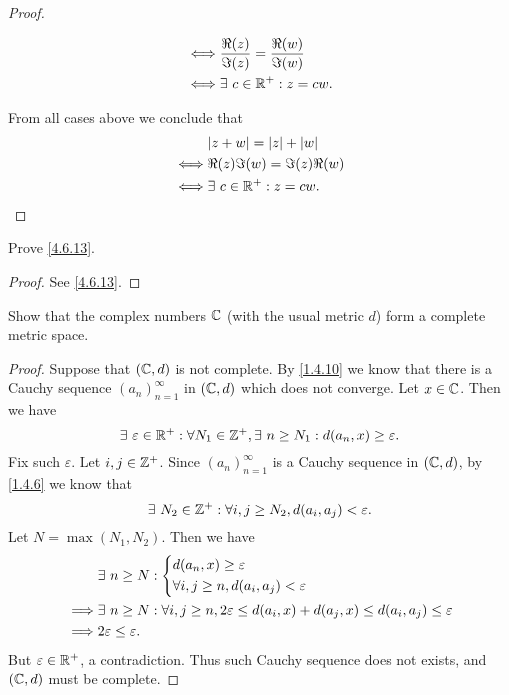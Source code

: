 \begin{proof}
\begin{itemize}
\begin{align*}
            \iff & \dfrac{\Re(z)}{\Im(z)} = \dfrac{\Re(w)}{\Im(w)} \\
            \iff & \exists\ c \in \mathbb{R}^+ : z = cw.
          \end{align*}
  \end{itemize}
  From all cases above we conclude that
  \begin{align*}
         & \abs{z + w} = \abs{z} + \abs{w} \\
    \iff & \Re(z) \Im(w) = \Im(z) \Re(w)   \\
    \iff & \exists\ c \in \R^+ : z = cw.
  \end{align*}
\end{proof}

\begin{ex}\label{ex:4.6.9}
  Prove \cref{4.6.13}.
\end{ex}

\begin{proof}
  See \cref{4.6.13}.
\end{proof}

\begin{ex}\label{ex:4.6.10}
  Show that the complex numbers \(\mathbb{C}\) (with the usual metric \(d\)) form a complete metric space.
\end{ex}

\begin{proof}
  Suppose that \((\mathbb{C}, d)\) is not complete.
  By \cref{1.4.10} we know that there is a Cauchy sequence \((a_n)_{n = 1}^\infty\) in \((\mathbb{C}, d)\) which does not converge.
  Let \(x \in \mathbb{C}\).
  Then we have
  \[
    \exists\ \varepsilon \in \mathbb{R}^+ : \forall N_1 \in \mathbb{Z}^+, \exists\ n \geq N_1 : d(a_n, x) \geq \varepsilon.
  \]
  Fix such \(\varepsilon\).
  Let \(i, j \in \mathbb{Z}^+\).
  Since \((a_n)_{n = 1}^\infty\) is a Cauchy sequence in \((\mathbb{C}, d)\), by \cref{1.4.6} we know that
  \[
    \exists\ N_2 \in \mathbb{Z}^+ : \forall i, j \geq N_2, d(a_i, a_j) < \varepsilon.
  \]
  Let \(N = \max(N_1, N_2)\).
  Then we have
  \begin{align*}
             & \exists\ n \geq N : \begin{dcases}
                                     d(a_n, x) \geq \varepsilon \\
                                     \forall i, j \geq n, d(a_i, a_j) < \varepsilon
                                   \end{dcases}                                                  \\
    \implies & \exists\ n \geq N : \forall i, j \geq n, 2\varepsilon \leq d(a_i, x) + d(a_j, x) \leq d(a_i, a_j) \leq \varepsilon \\
    \implies & 2\varepsilon \leq \varepsilon.
  \end{align*}
  But \(\varepsilon \in \mathbb{R}^+\), a contradiction.
  Thus such Cauchy sequence does not exists, and \((\mathbb{C}, d)\) must be complete.
\end{proof}

